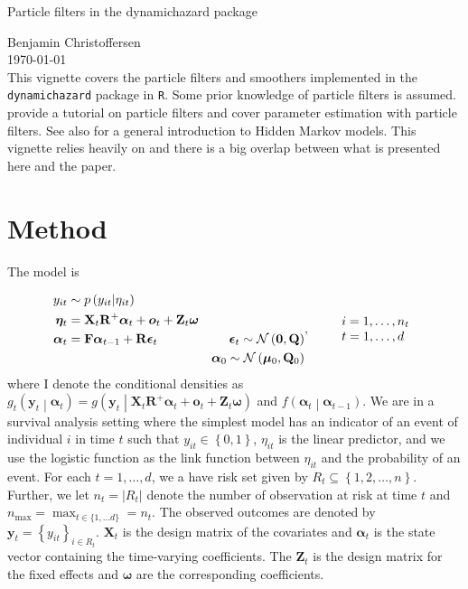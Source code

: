 \documentclass[notitlepage]{article}
\renewcommand{\vec}[1]{\bm{#1}}
\newcommand{\mat}[1]{\mathbf{#1}}
\newcommand{\Lbrace}[1]{\left\{ #1\right\}}
\newcommand{\Lparen}[1]{\left( #1\right)}
\newcommand{\Cond}[2]{ #1 \middle\vert  #2}
\newcommand{\optor}[2]{#1\Lparen{#2}}
\newcommand{\optorC}[3]{\optor{#1}{\Cond{#2}{#3}}}
\newcommand{\pdensC}[2]{\optorC{p}{#1}{#2}}
\newcommand{\normal}[2]{\optor{\mathcal{N}}{#1,#2}}
\newcommand{\nPeriods}{d}
\newcommand{\nMax}{n_{\text{max}}}
\newcommand*{\myTitle}{\begingroup
\centering
{\LARGE Particle filters in the dynamichazard package} \\[\baselineskip]
\scshape

Benjamin Christoffersen \\[\baselineskip]
\today \\[\baselineskip]
\vspace*{3\baselineskip}
\endgroup}
\begin{document}
\myTitle
This vignette covers the particle filters and smoothers implemented in the \texttt{dynamichazard} package in \texttt{R}. Some prior knowledge of particle filters is assumed.  \cite{doucet09} provide a tutorial 
on particle filters and \cite{kantas15} cover parameter estimation with particle filters. 
See also \cite{cappe05} for a general introduction to Hidden Markov models. 
This vignette relies heavily on \cite{fearnhead10} and there is a big overlap between what
is presented here and the paper. 

\section{Method}
The model is

\begin{equation}\label{eqn:model}
\begin{aligned}
 	y_{it} &\sim \pdensC{y_{it}}{\eta_{it}} &  \\
%
 	\vec{\eta}_{t} &= \mat{X}_t\mat R^+\vec{\alpha}_t + \vec{o}_t +  
 	\mat{Z}_t\vec{\omega} & \\
%
 	\vec{\alpha}_t &= \mat{F}\vec{\alpha}_{t - 1} + \mat{R}\vec{\epsilon}_t&
 		\vec{\epsilon}_t \sim \normal{\vec 0}{\mat Q} \\
%
	& \vphantom{a} &	\vec{\alpha}_0 \sim \normal{\vec\mu_0}{\mat{Q}_0}
\end{aligned}, \qquad
%
\begin{array}{l} i = 1, \dots, n_t \\ t = 1, \dots, d \end{array}
\end{equation}%
%
where I  denote the conditional densities as %
$\optorC{g_t}{\vec{y}_t}{\vec{\alpha}_t} = %
	\optorC{g}{\vec{y}_t}{\mat{X}_t\mat R^+\vec{\alpha}_t + \vec{o}_t +  \mat{Z}_t\vec{\omega}}$ and $\optorC{f}{\vec{\alpha}_t}{\vec{\alpha}_{t-1}}$. We are in a survival analysis setting where the simplest model has an indicator of an event of individual $i$ in time $t$ such that $y_{it} \in \Lbrace{0, 1}$, $\eta_{it}$ is the linear predictor, and we use the logistic function as the link function
between $\eta_{it}$ and the probability of an event. 
 For each $t=1,\dots,\nPeriods$, we a have risk set given by $R_t \subseteq \Lbrace{1,2,\dots,n}$. 
Further, we let $n_t = \vert R_t \vert$ denote the number of observation 
at risk at time $t$ 
and $\nMax = \max_{t \in\{1,\dots \nPeriods\}} = n_t$. The observed outcomes 
are denoted by $\vec{y}_t = \Lbrace{y_{it}}_{i \in R_t}$. $\mat{X}_t$ is the 
design matrix of the covariates and $\vec{\alpha}_t$ is the state vector 
containing the time-varying coefficients. 
The $\mat{Z}_t$ is the design matrix for the fixed 
effects and $\vec{\omega}$ are the corresponding coefficients.
\end{document}
